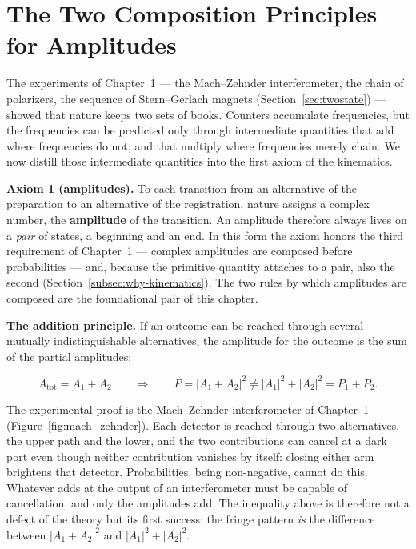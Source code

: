 \section{The Two Composition Principles for Amplitudes}
\label{sec:composition}

The experiments of Chapter~1 --- the Mach--Zehnder interferometer, the chain of polarizers, the sequence of Stern--Gerlach magnets (Section~\ref{sec:twostate}) --- showed that nature keeps two sets of books. Counters accumulate frequencies, but the frequencies can be predicted only through intermediate quantities that add where frequencies do not, and that multiply where frequencies merely chain. We now distill those intermediate quantities into the first axiom of the kinematics.

\textbf{Axiom 1 (amplitudes).} To each transition from an alternative of the preparation to an alternative of the registration, nature assigns a complex number, the \textbf{amplitude} of the transition. An amplitude therefore always lives on a \emph{pair} of states, a beginning and an end. In this form the axiom honors the third requirement of Chapter~1 --- complex amplitudes are composed before probabilities --- and, because the primitive quantity attaches to a pair, also the second (Section~\ref{subsec:why-kinematics}). The two rules by which amplitudes are composed are the foundational pair of this chapter.

\textbf{The addition principle.} If an outcome can be reached through several mutually indistinguishable alternatives, the amplitude for the outcome is the sum of the partial amplitudes:
\begin{linenomath}
\begin{equation}
    A_{\mathrm{tot}} = A_1 + A_2
    \qquad\Longrightarrow\qquad
    P = |A_1 + A_2|^2 \neq |A_1|^2 + |A_2|^2 = P_1 + P_2 .
    \label{eq:addition-principle}
\end{equation}
\end{linenomath}
The experimental proof is the Mach--Zehnder interferometer of Chapter~1 (Figure~\ref{fig:mach_zehnder}). Each detector is reached through two alternatives, the upper path and the lower, and the two contributions can cancel at a dark port even though neither contribution vanishes by itself: closing either arm brightens that detector. Probabilities, being non-negative, cannot do this. Whatever adds at the output of an interferometer must be capable of cancellation, and only the amplitudes add. The inequality above is therefore not a defect of the theory but its first success: the fringe pattern \emph{is} the difference between $|A_1 + A_2|^2$ and $|A_1|^2 + |A_2|^2$.

